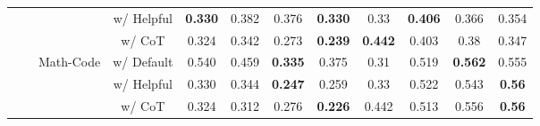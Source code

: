 \begin{table*}[t]
\begin{adjustbox}{width=1.0\textwidth}
\begin{tabular}{| c | c | c | c | c c c c | c c c c |}
            &   &   & w/ Helpful    & \textbf{0.330} & 0.382 & 0.376 & \textbf{0.330} & 0.33 & \textbf{0.406} & 0.366 & 0.354 \\
   
            &   &   & w/ CoT        & 0.324 & 0.342 & 0.273 & \textbf{0.239} & \textbf{0.442} & 0.403 & 0.38  & 0.347 \\
    \cline{3-12}
        &   \multirow{3}{*}{ } 
        & \multirow{3}{*}{Math-Code} 
            & w/ Default      & 0.540 & 0.459 & \textbf{0.335} & 0.375 & 0.31 & 0.519 & \textbf{0.562} & 0.555 \\
   
            &   &   & w/ Helpful    & 0.330 & 0.344 & \textbf{0.247} & 0.259 & 0.33 & 0.522 & 0.543 & \textbf{0.56} \\
   
            &   &   & w/ CoT        & 0.324 & 0.312 & 0.276 & \textbf{0.226} & 0.442 & 0.513 & 0.556 & \textbf{0.56} \\
    \bottomrule
\end{tabular}
\end{adjustbox}
\end{table*}


